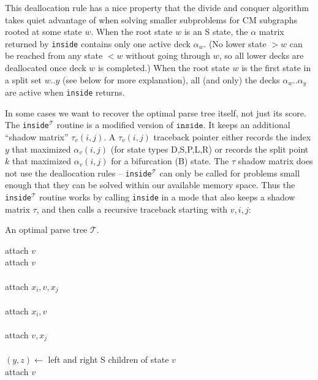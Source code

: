 \documentclass[11pt]{article}
\begin{document}
This deallocation rule has a nice property that the divide and conquer
algorithm takes quiet advantage of when solving smaller subproblems
for CM subgraphs rooted at some state $w$.  When the root state $w$ is
an S state, the $\alpha$ matrix returned by \texttt{inside} contains
only one active deck $\alpha_w$. (No lower state $>w$ can be reached
from any state $<w$ without going through $w$, so all lower decks are
deallocated once deck $w$ is completed.) When the root state $w$ is
the first state in a split set $w..y$ (see below for more
explanation), all (and only) the decks $\alpha_w..\alpha_y$ are active
when \texttt{inside} returns.

In some cases we want to recover the optimal parse tree itself, not
just its score. The \texttt{inside}$^{\mathcal{T}}$ routine is a
modified version of $\texttt{inside}$. It keeps an additional ``shadow
matrix'' $\tau_v(i,j)$. A $\tau_v(i,j)$ traceback pointer either
records the index $y$ that maximized $\alpha_v(i,j)$ (for state types
D,S,P,L,R) or records the split point $k$ that maximized
$\alpha_v(i,j)$ for a bifurcation (B) state. The $\tau$ shadow matrix
does not use the deallocation rules -- \texttt{inside}$^{\mathcal{T}}$
can only be called for problems small enough that they can be solved
within our available memory space. Thus the
\texttt{inside}$^{\mathcal{T}}$ routine works by calling
\texttt{inside} in a mode that also keeps a shadow matrix $\tau$,
and then calls a recursive traceback starting with $v,i,j$:

\begin{algorithm}
         {An optimal parse tree $\mathcal{T}$.}
\begin{algtab*}
    attach $v$\\
    attach $v$ \\
    \\
    attach $x_i,v,x_j$\\
    \\
    attach $x_i,v$\\
    \\
    attach $v,x_j$\\
    \\
    $(y,z) \leftarrow $ left and right S children of state $v$\\
    attach $v$\\
    \\
    \\
\algend
\end{algtab*}
\end{algorithm}
\end{document}
